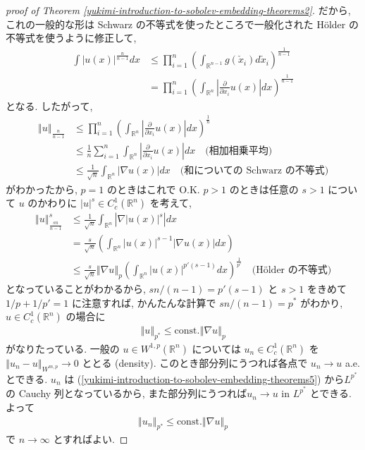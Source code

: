 \documentclass[openany, a4paper, oneside]{book}
\newcommand{\const}{\mathrm{const.}}
\theoremstyle{break}
\theoremstyle{breakdefn}
\newcommand{\abs}[1]{\left|#1\right|}
\newcommand{\norm}[1]{\left\Vert#1\right\Vert}
\newcommand{\rbk}[1]{\left (#1\right)}
\newcommand{\bbR}{\mathbb{R}}
\newcommand{\bbRn}{\mathbb{R}^n}
\begin{document}
\begin{proof}[proof of Theorem \ref{yukimi-introduction-to-sobolev-embedding-theorems2}]
だから, これの一般的な形は Schwarz の不等式を使ったところで一般化された H\"older の不等式を使うように修正して,
\begin{align}
 \int \abs{u(x)}^{\frac{n}{n-1}}dx
 &\le
 \prod_{i=1}^n \rbk{\int_{\bbR^{n-1}} g(\check{x}_i) d \check{x}_i}^{\frac{1}{n-1}} \\
 &=
 \prod_{i=1}^n \rbk{\int_{\bbR^{n}} \abs{\frac{\partial}{\partial x_i} u (x)} dx}^{\frac{1}{n-1}}
\end{align}
となる.
したがって,
\begin{align}
 \norm{u}_{\frac{n}{n-1}}
 &\le
 \prod_{i=1}^n \rbk{\int_{\bbR^{n}} \abs{\frac{\partial}{\partial x_i} u (x)} dx}^{\frac{1}{n}} \\
 &\le
 \frac{1}{n} \sum_{i=1}^n \int_{\bbR^{n}} \abs{\frac{\partial}{\partial x_i} u(x)} dx \quad \text{(相加相乗平均)} \\
 &\le
 \frac{1}{\sqrt{n}} \int_{\bbR^{n}} \abs{\nabla u(x)} dx \quad \text{(和についての Schwarz の不等式)}
\end{align}
がわかったから, $p=1$ のときはこれで O.K.
$p>1$ のときは任意の $s>1$ について $u$ のかわりに $\abs{u}^s \in C_c^1 (\bbR^n)$ を考えて,
\begin{align}\label{yukimi-introduction-to-sobolev-embedding-theorems4}
 \norm{u}_{\frac{sn}{n-1}}^s
 &\le
 \frac{1}{\sqrt{n}} \int_{\bbR^{n}} \abs{\nabla \abs{u(x)}^s} dx \\
 &=
 \frac{s}{\sqrt{n}} \rbk{\int_{\bbR^{n}} \abs{u (x)}^{s-1} \abs{\nabla u(x)} dx} \\
 &\le
 \frac{s}{\sqrt{n}} \norm{\nabla u}_{p} \rbk{\int_{\bbRn} \abs{u(x)}^{p'(s-1)}dx}^{\frac{1}{p'}} \quad \text{(H\"older の不等式)}
\end{align}
となっていることがわかるから,
$sn/ (n-1) = p'(s-1)$ と $s>1$ をきめて $1/p + 1/{p'} = 1$ に注意すれば,
かんたんな計算で $sn/ (n-1) = p^*$ がわかり,
$u \in C_c^1 (\bbR^n)$ の場合に
\begin{align}\label{yukimi-introduction-to-sobolev-embedding-theorems5}
 \norm{u}_{p^*}
 \le
 \const \norm{\nabla u}_p
\end{align}
がなりたっている.
一般の $u \in W^{1, p}(\bbR^n)$ については
$u_n \in C_c^1 (\bbR^n)$ を $\norm{u_n - u}_{W^{m, p}} \to 0$ ととる (density).
このとき部分列にうつれば各点で $u_n \to u$ a.e. とできる.
$u_n$ は (\ref{yukimi-introduction-to-sobolev-embedding-theorems5}) から$L^{p^*}$の Cauchy 列となっているから,
また部分列にうつれば$u_n \to u$ in $L^{p^*}$ とできる.
よって
\begin{align}
 \norm{u_n}_{p^*}
 \leq
 \const \norm{\nabla u}_p
\end{align}
で $n \to \infty$ とすればよい.
\end{proof}
\end{document}
